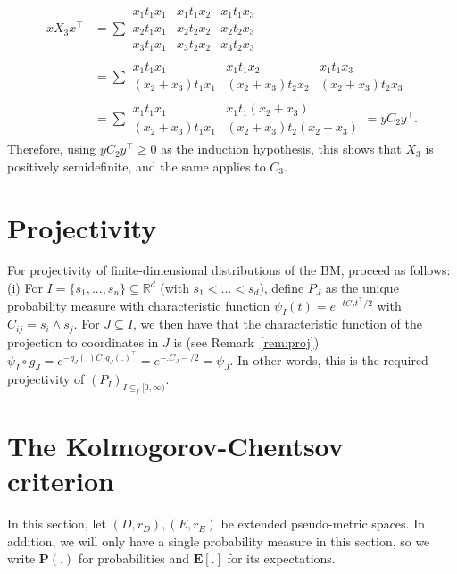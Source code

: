 \documentclass{article}
\theoremstyle{definition}
\theoremstyle{step} \newtheorem{step}{Step}
\begin{document}
\begin{enumerate}
\begin{align*}
    x X_3 x^\top & = \sum \begin{matrix} x_1 t_1 x_1 & x_1 t_1x_2 &
      x_1 t_1 x_3 \\ x_2 t_1 x_1 & x_2 t_2 x_2 & x_2 t_2x_3 \\ x_3 t_1
      x_1 & x_3 t_2 x_2& x_3 t_2x_3\end{matrix} \\ & =
      \sum \begin{matrix} x_1 t_1 x_1 & x_1 t_1x_2 & x_1 t_1 x_3
        \\ (x_2 + x_3) t_1 x_1 & (x_2 + x_3) t_2 x_2 & (x_2 +
        x_3)t_2x_3 \end{matrix} \\ & = \sum \begin{matrix} x_1 t_1 x_1
        & x_1 t_1(x_2 + x_3) \\ (x_2 + x_3) t_1 x_1 & (x_2 + x_3) t_2
        (x_2 + x_3) \end{matrix} = y C_2 y^\top.
  \end{align*}
  Therefore, using $y C_2 y^\top \geq 0$ as the induction hypothesis,
  this shows that $X_3$ is positively semidefinite, and the same
  applies to $C_3$.
\end{enumerate}


\section{Projectivity}\label{S:proj}
For projectivity of finite-dimensional distributions of the BM,
proceed as follows: (i) For $I = \{s_1,...,s_n\} \subseteq \mathbb
R^d$ (with $s_1 < ... < s_d$), define $P_J$ as the unique probability
measure with characteristic function $\psi_I(t) = e^{-tC_It^\top/2}$
with $C_{ij} = s_i \wedge s_j$. For $J\subseteq I$, we then have that
the characteristic function of the projection to coordinates in $J$ is
(see Remark~\ref{rem:proj}) $\psi_I \circ g_J = e^{- g_J(.)  C_I
  g_J(.)^\top} = e^{- . C_J -/2} = \psi_J$. In other words, this is
the required projectivity of $(P_I)_{I \subseteq_f [0,\infty)}$.

\section{The Kolmogorov-Chentsov criterion}
In this section, let $(D, r_D), (E, r_E)$ be extended pseudo-metric
spaces. In addition, we will only have a single probability measure in
this section, so we write $\mathbf P(.)$ for probabilities and
$\mathbf E[.]$ for its expectations.
\end{document}
